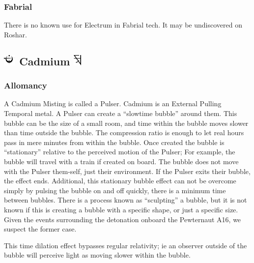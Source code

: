 \documentclass[conference]{IEEEtran}
\begin{document}
\subsubsection*{\textbf{Fabrial}}
There is no known use for Electrum in Fabrial tech.  It may be undiscovered on Roshar.
\subsection*{\includegraphics[height=1em]{images/Cadmium.png}  \textbf{Cadmium} \includegraphics[height=1em]{images/Cadmium_(Feruchemy).png}}
\subsubsection*{\textbf{Allomancy}}
A Cadmium Misting is called a Pulser.\cite{ARS}  Cadmium is an External Pulling Temporal metal.\cite{AL-TB}  A Pulser can create a ``slowtime bubble'' around them.\cite{ARS}  This bubble can be the size of a small room,\cite{BoM-CH17}\cite{AoL-CH19} and time within the bubble moves slower than time outside the bubble.\cite{ARS}  The compression ratio is enough to let real hours pass in mere minutes from within the bubble.\cite{AoL-CH19}  Once created the bubble is ``stationary'' relative to the perceived motion of the Pulser; For example, the bubble will travel with a train if created on board.\cite{BoM-CH8}  The bubble does not move with the Pulser them-self, just their environment.\cite{BoM-CH17}  If the Pulser exits their bubble, the effect ends.\cite{BoM-CH17}  Additional, this stationary bubble effect can not be overcome simply by pulsing the bubble on and off quickly, there is a minimum time between bubbles.\cite{AoL-CH6}  
There is a process known as ``sculpting'' a bubble,\cite{TLM-CH49} but it is not known if this is creating a bubble with a specific shape, or just a specific size.  Given the events surrounding the detonation onboard the Pewternaut A16,\cite{TLM-CH71} we suspect the former case.

This time dilation effect bypasses regular relativity; ie an observer outside of the bubble will perceive light as moving slower within the bubble.\cite{TLM-CH71}
\end{document}
